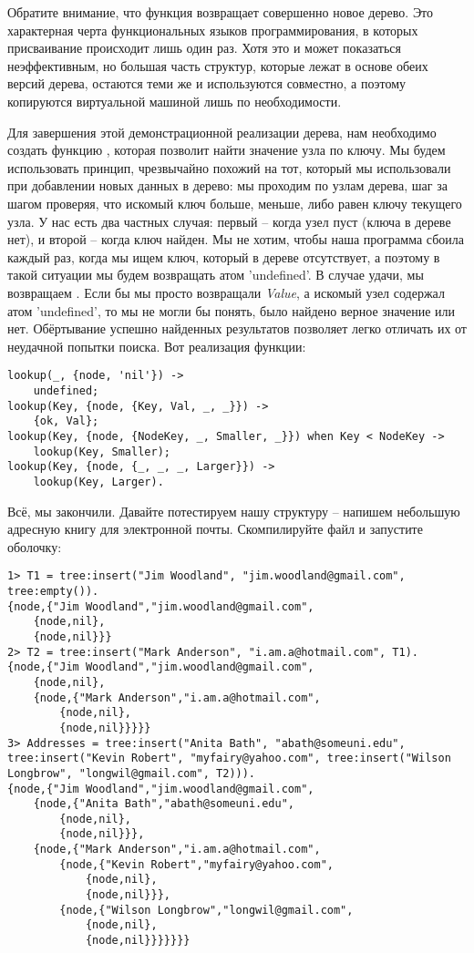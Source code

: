 Обратите внимание, что функция возвращает совершенно новое дерево.
Это характерная черта функциональных языков программирования, в которых присваивание происходит лишь один раз.
Хотя это и может показаться неэффективным, но большая часть структур, которые лежат в основе обеих версий дерева, остаются теми же и используются совместно, а поэтому копируются виртуальной машиной лишь по необходимости.

Для завершения этой демонстрационной реализации дерева, нам необходимо создать функцию , которая позволит найти значение узла по ключу.
Мы будем использовать принцип, чрезвычайно похожий на тот, который мы использовали при добавлении новых данных в дерево: мы проходим по узлам дерева, шаг за шагом проверяя, что искомый ключ больше, меньше, либо равен ключу текущего узла.
У нас есть два частных случая: первый \--- когда узел пуст (ключа в дереве нет), и второй \--- когда ключ найден.
Мы не хотим, чтобы наша программа сбоила каждый раз, когда мы ищем ключ, который в дереве отсутствует, а поэтому в такой ситуации мы будем возвращать атом 'undefined'.
В случае удачи, мы возвращаем .
Если бы мы просто возвращали \emph{Value}, а искомый узел содержал атом 'undefined', то мы не могли бы понять, было найдено верное значение или нет.
Обёртывание успешно найденных результатов позволяет легко отличать их от неудачной попытки поиска.
Вот реализация функции:
\begin{lstlisting}[style=erlang]
lookup(_, {node, 'nil'}) ->
    undefined;
lookup(Key, {node, {Key, Val, _, _}}) ->
    {ok, Val};
lookup(Key, {node, {NodeKey, _, Smaller, _}}) when Key < NodeKey ->
    lookup(Key, Smaller);
lookup(Key, {node, {_, _, _, Larger}}) ->
    lookup(Key, Larger).
\end{lstlisting}

Всё, мы закончили.
Давайте потестируем нашу структуру \--- напишем небольшую адресную книгу для электронной почты.
Скомпилируйте файл и запустите оболочку:
\begin{lstlisting}[style=erlang]
1> T1 = tree:insert("Jim Woodland", "jim.woodland@gmail.com", tree:empty()).
{node,{"Jim Woodland","jim.woodland@gmail.com",
    {node,nil},
    {node,nil}}}
2> T2 = tree:insert("Mark Anderson", "i.am.a@hotmail.com", T1).
{node,{"Jim Woodland","jim.woodland@gmail.com",
    {node,nil},
    {node,{"Mark Anderson","i.am.a@hotmail.com",
        {node,nil},
        {node,nil}}}}}
3> Addresses = tree:insert("Anita Bath", "abath@someuni.edu", tree:insert("Kevin Robert", "myfairy@yahoo.com", tree:insert("Wilson Longbrow", "longwil@gmail.com", T2))).
{node,{"Jim Woodland","jim.woodland@gmail.com",
    {node,{"Anita Bath","abath@someuni.edu",
        {node,nil},
        {node,nil}}},
    {node,{"Mark Anderson","i.am.a@hotmail.com",
        {node,{"Kevin Robert","myfairy@yahoo.com",
            {node,nil},
            {node,nil}}},
        {node,{"Wilson Longbrow","longwil@gmail.com",
            {node,nil},
            {node,nil}}}}}}}
\end{lstlisting}

